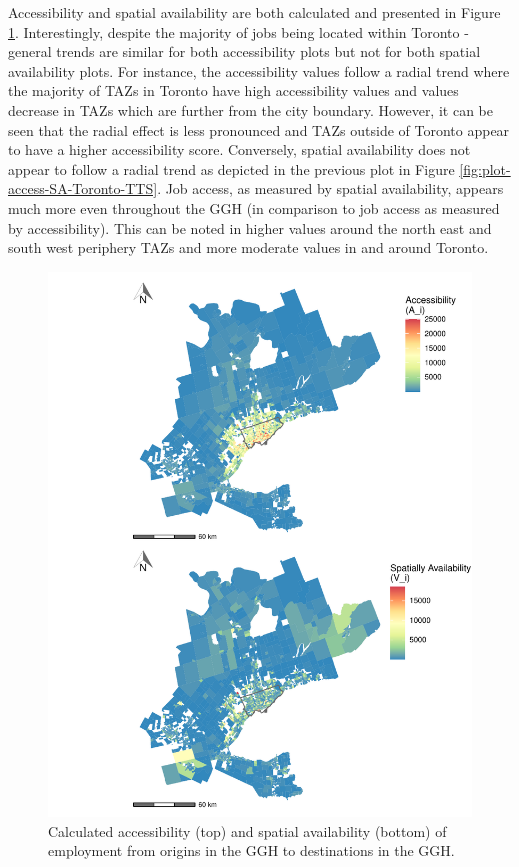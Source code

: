 \documentclass[]{elsarticle} %
\begin{document}
Accessibility and spatial availability are both calculated and presented
in Figure \ref{fig:plot-access-SA-GGH-TTS}. Interestingly, despite the
majority of jobs being located within Toronto - general trends are
similar for both accessibility plots but not for both spatial
availability plots. For instance, the accessibility values follow a
radial trend where the majority of TAZs in Toronto have high
accessibility values and values decrease in TAZs which are further from
the city boundary. However, it can be seen that the radial effect is
less pronounced and TAZs outside of Toronto appear to have a higher
accessibility score. Conversely, spatial availability does not appear to
follow a radial trend as depicted in the previous plot in Figure
\ref{fig:plot-access-SA-Toronto-TTS}. Job access, as measured by spatial
availability, appears much more even throughout the GGH (in comparison
to job access as measured by accessibility). This can be noted in higher
values around the north east and south west periphery TAZs and more
moderate values in and around Toronto.

\begin{figure}
\includegraphics[width=1\linewidth]{Spatial-Availability_files/figure-latex/plot-access-SA-GGH-TTS-1} \caption{\label{fig:plot-access-SA-GGH-TTS}Calculated accessibility (top) and spatial availability (bottom) of employment from origins in the GGH to destinations in the GGH.}\label{fig:plot-access-SA-GGH-TTS}
\end{figure}
\end{document}
